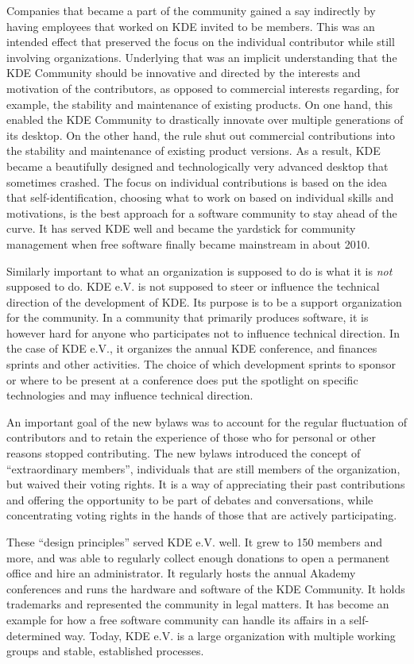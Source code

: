 Companies that became a part of the community
gained a say indirectly by having employees that worked on KDE invited
to be members. This was an intended effect that preserved the focus on
the individual contributor while still involving
organizations. Underlying that was an implicit understanding that the
KDE Community should be innovative and directed by the interests and
motivation of the contributors, as opposed to commercial interests
regarding, for example, the stability and maintenance of existing
products. On one hand, this enabled the KDE Community to drastically
innovate over multiple generations of its desktop. On the other hand,
the rule shut out commercial contributions into the stability and
maintenance of existing product versions. As a result, KDE became a
beautifully designed and technologically very advanced desktop that
sometimes crashed. The focus on individual contributions is based on
the idea that self-identification, choosing what to work on based on
individual skills and motivations, is the best approach for a software
community to stay ahead of the curve. It has served KDE well and
became the yardstick for community management when free software
finally became mainstream in about 2010.

Similarly important to what an organization is supposed to do is what
it is {\em not} supposed to do. KDE e.V. is not supposed to steer or
influence the technical direction of the development of KDE. Its
purpose is to be a support organization for the community. In a
community that primarily produces software, it is however hard for
anyone who participates not to influence technical direction. In the
case of KDE e.V., it organizes the annual KDE conference, and finances
sprints and other activities. The choice of which development sprints
to sponsor or where to be present at a conference does put the
spotlight on specific technologies and may influence technical
direction. 

An important goal of the new bylaws was to account for the regular
fluctuation of contributors and to retain the experience of those who
for personal or other reasons stopped contributing. The new bylaws
introduced the concept of ``extraordinary members'', individuals that
are still members of the organization, but waived their voting
rights. It is a way of appreciating their past contributions and
offering the opportunity to be part of debates and conversations,
while concentrating voting rights in the hands of those that are
actively participating.

These ``design principles'' served KDE e.V. well. It grew to 150
members and more, and was able to regularly collect enough donations
to open a permanent office and hire an administrator. It regularly
hosts the annual Akademy conferences and runs the hardware and
software of the KDE Community. It holds trademarks and represented the
community in legal matters. It has become an example for how a free
software community can handle its affairs in a self-determined 
way. Today, KDE e.V. is a large organization with multiple working
groups and stable, established processes.

